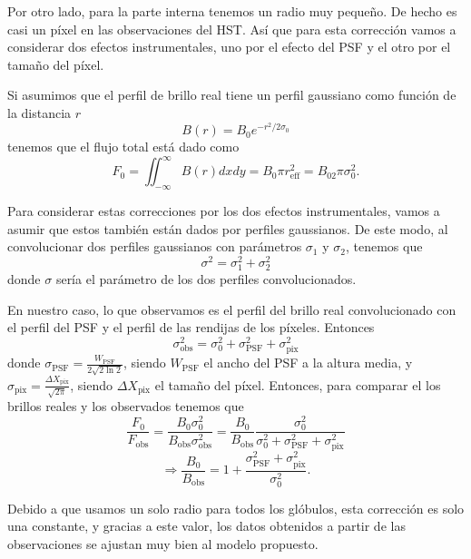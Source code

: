 \documentclass{book}
\begin{document}
Por otro lado, para la parte interna tenemos un radio muy pequeño. De hecho es casi un píxel en las observaciones del HST. Así que para esta corrección vamos a considerar dos efectos instrumentales, uno por el efecto del PSF y el otro por el tamaño del píxel.

Si asumimos que el perfil de brillo real tiene un perfil gaussiano como función de la distancia $r$ 
\begin{equation}
B(r)= B_0 e^{-r^2/2\sigma_0}
\end{equation} 
tenemos que el flujo total está dado como 
\begin{equation}
F_0=\iint_{-\infty}^\infty B(r)dxdy=B_0 \pi r_\mathrm{eff}^2=B_02\pi \sigma_0^2.
\end{equation}

Para considerar estas correcciones por los dos efectos instrumentales, vamos a asumir que estos también están dados por perfiles gaussianos. De este modo, al convolucionar dos perfiles gaussianos con parámetros $\sigma_1$ y $\sigma_2$, tenemos que 
\begin{equation}
\sigma^2=\sigma_1^2+\sigma_2^2
\end{equation}
donde $\sigma$ sería el parámetro de los dos perfiles convolucionados.

En nuestro caso, lo que observamos es el perfil del brillo real convolucionado con el perfil del PSF y el perfil de las rendijas de los píxeles. Entonces 
\begin{equation}
\sigma_\mathrm{obs}^2=\sigma_0^2+\sigma_\mathrm{PSF}^2+\sigma_\mathrm{pix}^2
\end{equation}
donde $\sigma_\mathrm{PSF}=\frac{W_\mathrm{PSF}}{2\sqrt{2\ln{2}}}$, siendo $W_\mathrm{PSF}$ el ancho del PSF a la altura media, y $\sigma_\mathrm{pix}=\frac{\Delta X_\mathrm{pix}}{\sqrt{2\pi}}$, siendo $\Delta X_\mathrm{pix}$ el tamaño del píxel. Entonces, para comparar el los brillos reales y los observados tenemos que
\begin{equation}
\frac{F_0}{F_\mathrm{obs}}=\frac{B_0\sigma_0^2}{B_\mathrm{obs}\sigma_\mathrm{obs}^2}=\frac{B_0}{B_\mathrm{obs}}\frac{\sigma_0^2}{\sigma_0^2+\sigma_\mathrm{PSF}^2+\sigma_\mathrm{pix}^2}
\end{equation} 
\begin{equation}
\Rightarrow \frac{B_0}{B_\mathrm{obs}}=1+\frac{\sigma_\mathrm{PSF}^2+\sigma_\mathrm{pix}^2}{\sigma_0^2}.
\end{equation}

Debido a que usamos un solo radio para todos los glóbulos, esta corrección es solo una constante, y gracias a este valor, los datos obtenidos a partir de las observaciones se ajustan muy bien al modelo propuesto.
\end{document}
